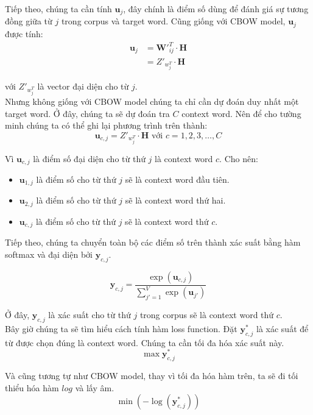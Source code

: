 \documentclass[12pt]{article}
\newcommand{\twiceIndent}{\hspace{\parindent}}
\newcommand{\itemsizePaddingLeft}{\setlength{\itemindent}{0.6cm}}
\begin{document}
\indent Tiếp theo, chúng ta cần tính $\boldsymbol{u}_j$, đây chính là điểm số dùng để đánh giá sự tương đồng giữa từ $j$ trong corpus và target word. Cũng giống với CBOW model, $\boldsymbol{u}_j$ được tính:
$$\begin{aligned}\boldsymbol{u}_j &= \boldsymbol{W'}_{ij}^T \cdot \boldsymbol{H} \\ 
  &= Z'_{w_j^T} \cdot \boldsymbol{H} \end{aligned}$$

\twiceIndent với $Z'_{w_j^T}$ là vector đại diện cho từ $j$.\\

\indent Nhưng không giống với CBOW model chúng ta chỉ cần dự đoán duy nhất một target word. Ở đây, chúng ta sẽ dự đoán tra $C$ context word. Nên để cho tường minh chúng ta có thể ghi lại phương trình trên thành:
$$\boldsymbol{u}_{c,j} = Z'_{w_j^T} \cdot \boldsymbol{H} \text{ với } c = 1, 2, 3, \hdots,C$$

\indent Vì $\boldsymbol{u}_{c,j}$ là điểm số đại diện cho từ thứ $j$ là context word $c$. Cho nên:
\begin{itemize}
  \itemsizePaddingLeft
  \item $\boldsymbol{u}_{1,j}$ là điểm số cho từ thứ $j$ sẽ là context word đầu tiên.
  \item $\boldsymbol{u}_{2,j}$ là điểm số cho từ thứ $j$ sẽ là context word thứ hai.
  \item $\boldsymbol{u}_{c,j}$ là điểm số cho từ thứ $j$ sẽ là context word thứ $c$.
\end{itemize}

\vskip 0.5cm
\indent Tiếp theo, chúng ta chuyển toàn bộ các điểm số trên thành xác suất bằng hàm softmax và đại diện bởi $\boldsymbol{y}_{c,j}$.

\begin{equation}
  \boldsymbol{y}_{c,j} = \dfrac{\exp{(\boldsymbol{u}_{c,j})}}{\sum_{j'=1}^V \exp{(\boldsymbol{u}_{j'})}}
\end{equation}

\indent Ở đây, $\boldsymbol{y}_{c,j}$ là xác suất cho từ thứ $j$ trong corpus sẽ là context word thứ $c$.\\

\indent Bây giờ chúng ta sẽ tìm hiểu cách tính hàm loss function. Đặt $\boldsymbol{y}^*_{c,j}$ là xác suất để từ được chọn đúng là context word. Chúng ta cần tối đa hóa xác suất này.
$$\max{\boldsymbol{y}^*_{c,j}}$$

\indent Và cũng tương tự như CBOW model, thay vì tối đa hóa hàm trên, ta sẽ đi tối thiểu hóa hàm $log$ và lấy âm.
$$\min{(-\log{(\boldsymbol{y}^*_{c,j})})}$$
\end{document}
